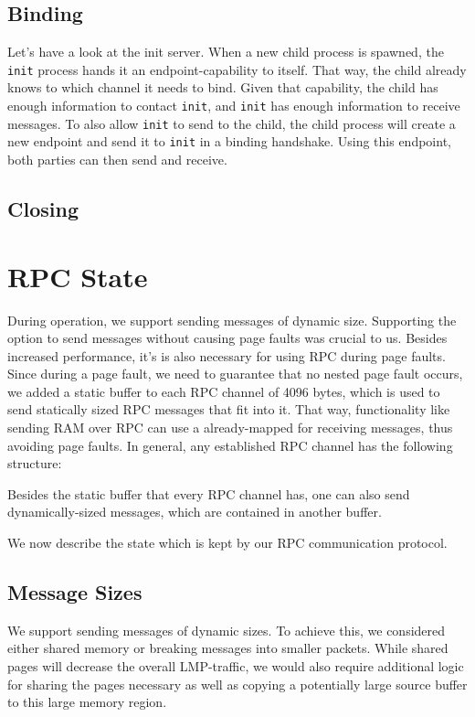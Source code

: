 \subsection{Binding}
Let's have a look at the init server.
When a new child process is spawned, the \texttt{init} process hands it an endpoint-capability
to itself. That way, the child already knows to which channel it needs to bind. 
Given that capability, the child has enough information to contact \texttt{init}, and 
\texttt{init} has enough information to receive messages. To also allow \texttt{init}
to send to the child, the child process will create a new endpoint and send it to \texttt{init}
in a binding handshake. Using this endpoint, both parties can then send and receive.

\subsection{Closing}

\section{RPC State}
During operation, we support sending messages of dynamic size.
Supporting the option to send messages without causing page faults was crucial 
to us. Besides increased performance, it's is also necessary for using RPC 
during page faults. Since during a page fault, we need to guarantee that no 
nested page fault occurs, we added a static buffer to each RPC channel of 4096 bytes, 
which is used to send statically sized RPC messages that fit into it.
That way, functionality like sending RAM over RPC can use a already-mapped for 
receiving messages, thus avoiding page faults. In general, any established 
RPC channel has the following structure:

Besides the static buffer that every RPC channel has, one can also send 
dynamically-sized messages, which are contained in another buffer.




We now describe the state which is kept by our RPC communication protocol.

\subsection{Message Sizes}
We support sending messages of dynamic sizes. To achieve this, we considered 
either shared memory or breaking messages into smaller packets.
While shared pages will decrease the overall LMP-traffic, we would also 
require additional logic for sharing the pages necessary as well as 
copying a potentially large source buffer to this large memory region.

